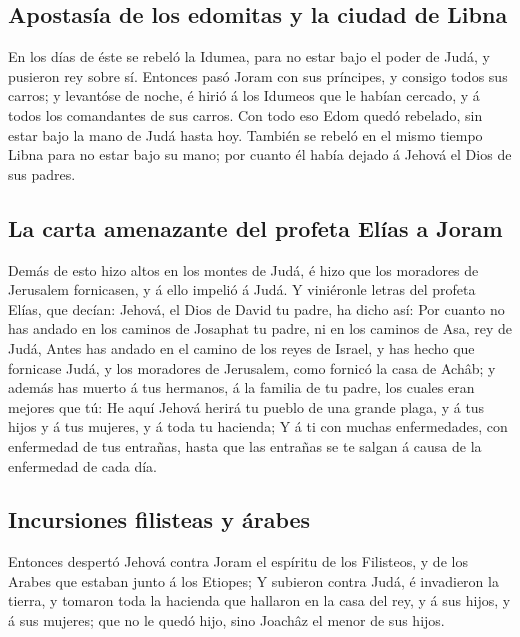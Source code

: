 \hypertarget{apostasuxeda-de-los-edomitas-y-la-ciudad-de-libna}{%
\subsection{Apostasía de los edomitas y la ciudad de
Libna}\label{apostasuxeda-de-los-edomitas-y-la-ciudad-de-libna}}

 En los días de éste se rebeló la Idumea, para no estar bajo
el poder de Judá, y pusieron rey sobre sí.  Entonces pasó
Joram con sus príncipes, y consigo todos sus carros; y levantóse de
noche, é hirió á los Idumeos que le habían cercado, y á todos los
comandantes de sus carros.  Con todo eso Edom quedó
rebelado, sin estar bajo la mano de Judá hasta hoy. También se rebeló en
el mismo tiempo Libna para no estar bajo su mano; por cuanto él había
dejado á Jehová el Dios de sus padres.

\hypertarget{la-carta-amenazante-del-profeta-eluxedas-a-joram}{%
\subsection{La carta amenazante del profeta Elías a
Joram}\label{la-carta-amenazante-del-profeta-eluxedas-a-joram}}

 Demás de esto hizo altos en los montes de Judá, é hizo que
los moradores de Jerusalem fornicasen, y á ello impelió á Judá.
 Y viniéronle letras del profeta Elías, que decían: Jehová,
el Dios de David tu padre, ha dicho así: Por cuanto no has andado en los
caminos de Josaphat tu padre, ni en los caminos de Asa, rey de Judá,
 Antes has andado en el camino de los reyes de Israel, y
has hecho que fornicase Judá, y los moradores de Jerusalem, como fornicó
la casa de Achâb; y además has muerto á tus hermanos, á la familia de tu
padre, los cuales eran mejores que tú:  He aquí Jehová
herirá tu pueblo de una grande plaga, y á tus hijos y á tus mujeres, y á
toda tu hacienda;  Y á ti con muchas enfermedades, con
enfermedad de tus entrañas, hasta que las entrañas se te salgan á causa
de la enfermedad de cada día.

\hypertarget{incursiones-filisteas-y-uxe1rabes}{%
\subsection{Incursiones filisteas y
árabes}\label{incursiones-filisteas-y-uxe1rabes}}

 Entonces despertó Jehová contra Joram el espíritu de los
Filisteos, y de los Arabes que estaban junto á los Etiopes;
 Y subieron contra Judá, é invadieron la tierra, y tomaron
toda la hacienda que hallaron en la casa del rey, y á sus hijos, y á sus
mujeres; que no le quedó hijo, sino Joachâz el menor de sus hijos.

